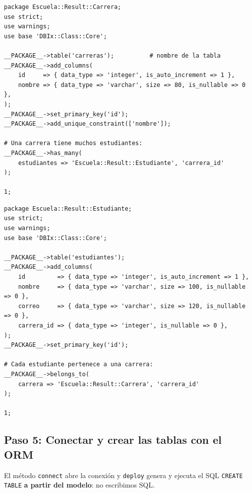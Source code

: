 \documentclass[11pt]{article}
\begin{document}
\begin{cajacodigo}
\begin{lstlisting}[style=perl]
package Escuela::Result::Carrera;
use strict;
use warnings;
use base 'DBIx::Class::Core';

__PACKAGE__->table('carreras');          # nombre de la tabla
__PACKAGE__->add_columns(
    id     => { data_type => 'integer', is_auto_increment => 1 },
    nombre => { data_type => 'varchar', size => 80, is_nullable => 0 },
);
__PACKAGE__->set_primary_key('id');
__PACKAGE__->add_unique_constraint(['nombre']);

# Una carrera tiene muchos estudiantes:
__PACKAGE__->has_many(
    estudiantes => 'Escuela::Result::Estudiante', 'carrera_id'
);

1;
\end{lstlisting}
\end{cajacodigo}
\vspace{2pt}
\begin{cajacodigo}
\begin{lstlisting}[style=perl]
package Escuela::Result::Estudiante;
use strict;
use warnings;
use base 'DBIx::Class::Core';

__PACKAGE__->table('estudiantes');
__PACKAGE__->add_columns(
    id         => { data_type => 'integer', is_auto_increment => 1 },
    nombre     => { data_type => 'varchar', size => 100, is_nullable => 0 },
    correo     => { data_type => 'varchar', size => 120, is_nullable => 0 },
    carrera_id => { data_type => 'integer', is_nullable => 0 },
);
__PACKAGE__->set_primary_key('id');

# Cada estudiante pertenece a una carrera:
__PACKAGE__->belongs_to(
    carrera => 'Escuela::Result::Carrera', 'carrera_id'
);

1;
\end{lstlisting}
\end{cajacodigo}
\vspace{2pt}
\subsection{Paso 5: Conectar y crear las tablas con el ORM}
El método \texttt{connect} abre la conexión y \texttt{deploy} genera y ejecuta el SQL \texttt{CREATE TABLE} \textbf{a partir del modelo}: no escribimos SQL.
\end{document}
